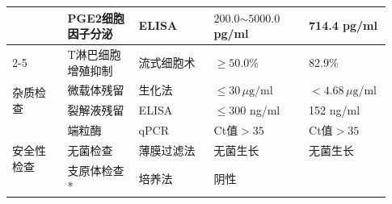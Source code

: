 \documentclass[UTF8,10pt,a4paper,fontset=fandol]{ctexart}
\newcommand{\fieldvalue}[1]{#1}
\begin{document}
\begin{tabular}{|p{0.14\linewidth}|p{0.18\linewidth}|p{0.19\linewidth}|p{0.24\linewidth}|p{0.18\linewidth}|}
&
\fieldvalue{PGE2细胞因子分泌}
&
\fieldvalue{ELISA}
&
\fieldvalue{$200.0\mathord{\sim}5000.0$ pg/ml}
&
\fieldvalue{714.4 pg/ml}
\\ \cline{2-5}
&
\fieldvalue{T淋巴细胞增殖抑制}
&
\fieldvalue{流式细胞术}
&
\fieldvalue{$\geq 50.0\%$}
&
\fieldvalue{82.9\%}
\\ \hline
\multirow{2}{*}{杂质检查}
&
\fieldvalue{微载体残留}
&
\fieldvalue{生化法}
&
\fieldvalue{$\leq30\,\mu\mathrm{g}/\mathrm{ml}$}
&
\fieldvalue{$<4.68\,\mu\mathrm{g}/\mathrm{ml}$}
\\ \cline{2-5}
&
\fieldvalue{裂解液残留}
&
\fieldvalue{ELISA}
&
\fieldvalue{$\leq300$ ng/ml}
&
\fieldvalue{152 ng/ml}
\\ \hline
\multirow{5}{*}{安全性检查}
&
\fieldvalue{端粒酶}
&
\fieldvalue{qPCR}
&
\fieldvalue{Ct值$>35$}
&
\fieldvalue{Ct值$>35$}
\\ \cline{2-5}
&
\fieldvalue{无菌检查}
&
\fieldvalue{薄膜过滤法}
&
\fieldvalue{无菌生长}
&
\fieldvalue{无菌生长}
\\ \cline{2-5}
&
\fieldvalue{支原体检查*}
&
\fieldvalue{培养法}
&
\fieldvalue{阴性}
&

\end{tabular}
\end{document}
